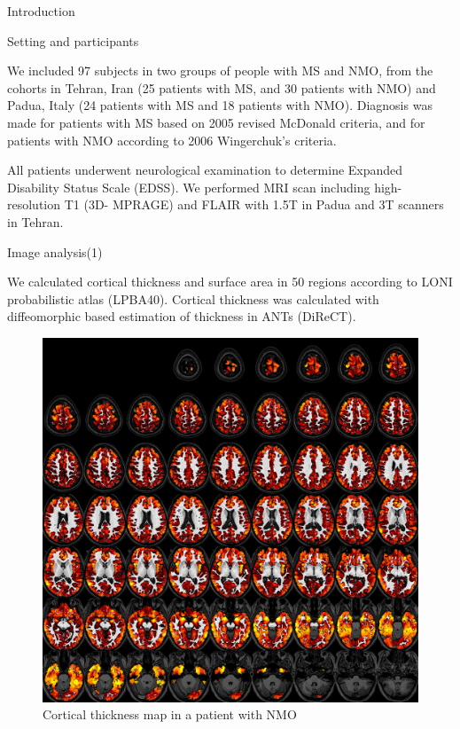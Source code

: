 \documentclass[final]{beamer}
\newlength{\onecolwid}
\begin{document}
\begin{frame}[t]
\begin{columns}[t]
\begin{column}{\onecolwid}
\begin{block}{Introduction}
\end{block}



\begin{block}{Setting and participants}

We included 97 subjects in two groups of people with MS and NMO, from the
cohorts in Tehran, Iran (25 patients with MS, and 30 patients with NMO) and Padua, 
Italy (24 patients with MS and 18 patients with NMO). Diagnosis was made for 
patients with MS based on 2005 revised McDonald criteria, and for patients with NMO 
according to 2006 Wingerchuk's criteria.

All patients underwent neurological examination to determine Expanded Disability 
Status Scale (EDSS). We performed MRI scan including high-resolution T1 (3D-
MPRAGE) and FLAIR with 1.5T in Padua and 3T scanners in Tehran.


\end{block}

\begin{block}{Image analysis(1)}

We calculated cortical thickness and surface area in 50 regions according to LONI probabilistic atlas (LPBA40). Cortical thickness was calculated with diffeomorphic based estimation of thickness in ANTs (DiReCT).

\begin{figure}
\includegraphics[width=0.9\linewidth]{NMO_THICKNESS_PAPER.png}
\caption{Cortical thickness map in a patient with NMO}
\end{figure}



\end{block}
\end{column}
\end{columns}
\end{frame}
\end{document}
